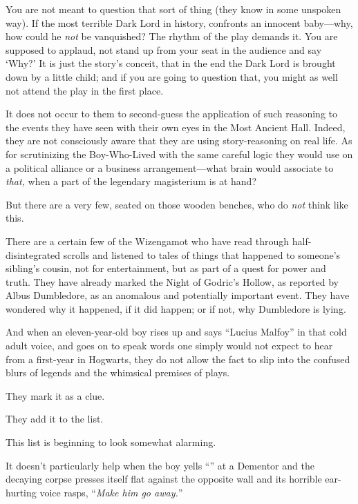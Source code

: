 You are not meant to question that sort of thing (they know in some unspoken way). If the most terrible Dark Lord in history, confronts an innocent baby—why, how could he \emph{not} be vanquished? The rhythm of the play demands it. You are supposed to applaud, not stand up from your seat in the audience and say ‘Why?’ It is just the story’s conceit, that in the end the Dark Lord is brought down by a little child; and if you are going to question that, you might as well not attend the play in the first place.

It does not occur to them to second-guess the application of such reasoning to the events they have seen with their own eyes in the Most Ancient Hall. Indeed, they are not consciously aware that they are using story-reasoning on real life. As for scrutinizing the Boy-Who-Lived with the same careful logic they would use on a political alliance or a business arrangement—what brain would associate to \emph{that,} when a part of the legendary magisterium is at hand?

But there are a very few, seated on those wooden benches, who do \emph{not} think like this.

There are a certain few of the Wizengamot who have read through
half-disintegrated scrolls and listened to tales of things that happened to someone’s sibling’s cousin, not for entertainment, but as part of a quest for power and truth. They have already marked the Night of Godric’s Hollow, as reported by Albus Dumbledore, as an anomalous and potentially important event. They have wondered why it happened, if it did happen; or if not, why Dumbledore is lying.

And when an eleven-year-old boy rises up and says “Lucius Malfoy” in that cold adult voice, and goes on to speak words one simply would not expect to hear from a first-year in Hogwarts, they do not allow the fact to slip into the confused blurs of legends and the whimsical premises of plays.

They mark it as a clue.

They add it to the list.

This list is beginning to look somewhat alarming.

It doesn’t particularly help when the boy yells “” at a Dementor and the decaying corpse presses itself flat against the opposite wall and its horrible ear-hurting voice rasps, “\emph{Make him go away.}”

